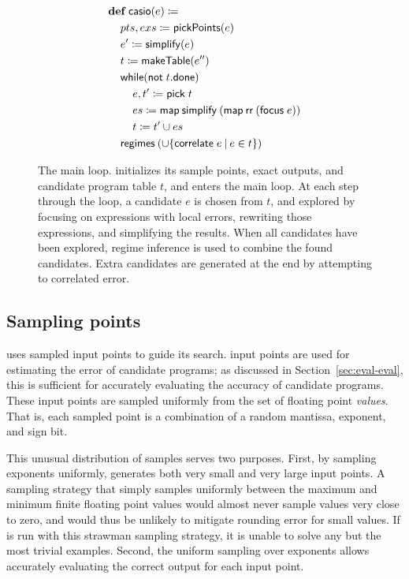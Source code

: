 \documentclass[paper.tex]{subfiles}
\begin{document}
\begin{figure}
\begin{footnotesize}
\begin{align*}
  &\!def!\:\|casio|(e) \ceq \\
  &\> pts, exs \ceq \|pickPoints|(e) \\
  &\> e' \ceq \|simplify|(e) \\
  &\> t \ceq \|makeTable|(e'') \\
  &\> \|while|(\|not| \; t.\|done|) \\
  &\> \> e, t' \ceq \|pick|\;t \\
  &\> \> es \ceq \|map|\:\|simplify|\:(\|map|\:\|rr|\:(\|focus|\;e)) \\
  &\> \> t \ceq t' \cup es \\
  &\> \|regimes|\:(\cup\{\|correlate|\;e \I e \in t \})
\end{align*}
\end{footnotesize}
\caption{The \casio main loop.
  \casio initializes its sample points, exact outputs,
    and candidate program table $t$, and enters the main loop.
  At each step through the loop, a candidate $e$ is chosen from $t$,
    and explored by focusing on expressions with local errors,
    rewriting those expressions, and simplifying the results.
  When all candidates have been explored,
    regime inference is used to combine the found candidates.
  Extra candidates are generated at the end by attempting to correlated error.}
\label{alg:main}
\end{figure}

\subsection{Sampling points}

\casio uses sampled input points to guide its search.
\nSample input points are used
  for estimating the error of candidate programs;
  as discussed in Section~\ref{sec:eval-eval},
  this is sufficient for accurately evaluating the accuracy
  of candidate programs.
These input points are sampled uniformly
  from the set of floating point \emph{values}.
That is, each sampled point is a combination of a random
  mantissa, exponent, and sign bit.

This unusual distribution of samples serves two purposes.
First, by sampling exponents uniformly, \casio generates
  both very small and very large input points.
A sampling strategy that simply samples uniformly between
  the maximum and minimum finite floating point values
  would almost never sample values very close to zero,
  and would thus be unlikely to mitigate rounding error for small values.
If \casio is run with this strawman sampling strategy,
  it is unable to solve any but the most trivial examples.
Second, the uniform sampling over exponents allows
  accurately evaluating the correct output for each input point.
\end{document}
